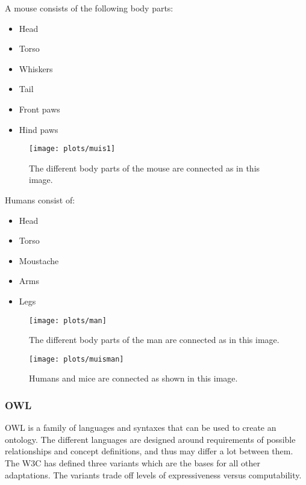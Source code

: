 \documentclass{article}
\begin{document}
\begin{minipage}{0.3\textwidth}
 A mouse consists of the following body parts:
 \begin{itemize}
 \item Head
 \item Torso
 \item Whiskers
 \item Tail
 \item Front paws
 \item Hind paws
 \end{itemize}
\end{minipage} \hfill
\begin{minipage}{0.65\textwidth}
 \begin{figure}[H]
 \texttt{[image: plots/muis1]}
 \label{mouse_example}
 \caption{The different body parts of the mouse are connected as in this image.}
 \end{figure}
\end{minipage}

\begin{minipage}{0.3\textwidth}
 Humans consist of:
 \begin{itemize}
 \item Head
 \item Torso
 \item Moustache
 \item Arms
 \item Legs
 \end{itemize}
\end{minipage} \hfill
\begin{minipage}{0.7\textwidth}
 \begin{figure}[H]
 \texttt{[image: plots/man]}
 \label{man_example}
 \caption{The different body parts of the man are connected as in this image.}
 \end{figure}
\end{minipage}
  
 
 \begin{figure}[H]
 \texttt{[image: plots/muisman]}
 \label{muis_man_example}
 \caption{Humans and mice are connected as shown in this image.}
 \end{figure}
 
 
 \subsubsection{OWL}
 OWL is a family of languages and syntaxes that can be used to create an ontology. The different languages are designed around requirements of possible relationships and concept definitions, and thus may differ a lot between them. The W3C has defined three variants which are the bases for all other adaptations. The variants trade off levels of expressiveness versus computability.
\end{document}
